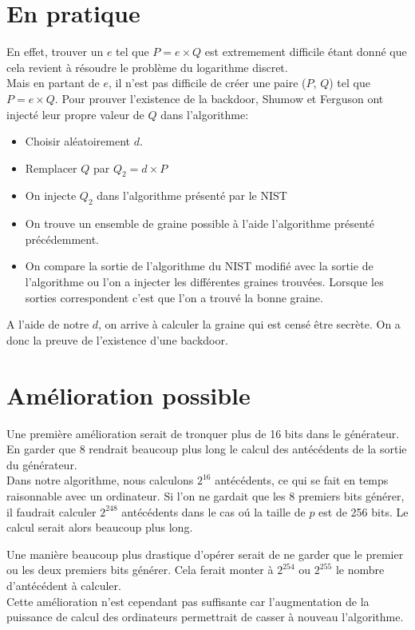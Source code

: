 \documentclass[a4paper,11pt]{report}
\begin{document}
	\section{En pratique}
	En effet, trouver un $e$ tel que $P=e\times Q$ est extremement difficile \'etant donn\'e que cela %
	revient \`a r\'esoudre le probl\`eme du logarithme discret. \\
	Mais en partant de $e$, il n'est pas difficile de cr\'eer une paire ($P$, $Q$) tel que $P=e\times Q$.
	Pour prouver l'existence de la backdoor, Shumow et Ferguson ont inject\'e leur propre valeur de $Q$ dans l'algorithme: \\
	\begin{itemize}
	\item Choisir al\'eatoirement $d$.
	\item Remplacer $Q$ par $Q_2= d\times P$
	\item On injecte $Q_2$ dans l'algorithme pr\'esent\'e par le NIST
	\item On trouve un ensemble de graine possible \`a l'aide l'algorithme pr\'esent\'e pr\'ec\'edemment.
	\item On compare la sortie de l'algorithme du NIST modifi\'e avec la sortie de l'algorithme ou l'on a injecter les diff\'erentes graines trouv\'ees. Lorsque les sorties correspondent c'est que l'on a trouv\'e la bonne graine.
	\end{itemize}
	
	A l'aide de notre $d$, on arrive \`a calculer la graine qui est cens\'e \^etre secr\`ete. On a donc la %
	preuve de l'existence d'une backdoor.

	\section{Am\'elioration possible}
	Une premi\`ere am\'elioration serait de tronquer plus de 16 bits dans le g\'en\'erateur. En garder %
	que 8 rendrait beaucoup plus long le calcul des ant\'ec\'edents de la sortie du g\'en\'erateur. \\
	
	Dans notre algorithme, nous calculons $2^{16}$ ant\'ec\'edents, ce qui se fait en temps raisonnable %
	avec un ordinateur. Si l'on ne gardait que les 8 premiers bits g\'en\'erer, il faudrait calculer %
	$2^{248}$ ant\'ec\'edents dans le cas o\'u la taille de $p$ est de 256 bits. Le calcul serait alors beaucoup plus long. 
	
	
	Une mani\`ere beaucoup plus drastique d'op\'erer serait de ne garder que le premier ou les deux premiers bits g\'en\'erer. Cela ferait monter \`a $2^{254}$ ou $2^{255}$ le nombre d'ant\'ec\'edent %
	 \`a calculer. \\
	 Cette am\'elioration n'est cependant pas suffisante car l'augmentation de la puissance de calcul des ordinateurs permettrait de casser \`a nouveau l'algorithme.\\
	
\end{document}
